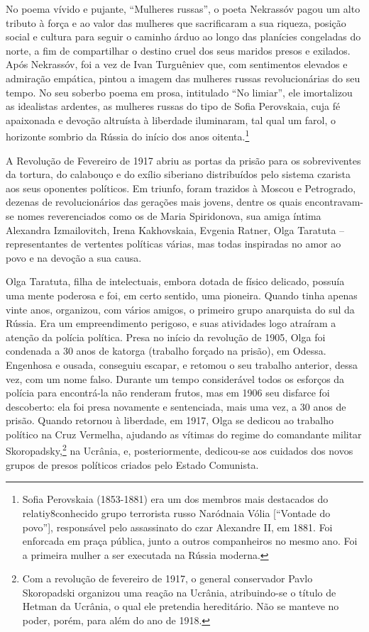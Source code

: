 No poema vívido e pujante, ``Mulheres russas'', o poeta Nekrassóv pagou
um alto tributo à força e ao valor das mulheres que sacrificaram a sua
riqueza, posição social e cultura para seguir o caminho árduo ao longo
das planícies congeladas do norte, a fim de compartilhar o destino cruel
dos seus maridos presos e exilados. Após Nekrassóv, foi a vez de Ivan
Turguêniev que, com sentimentos elevados e admiração empática, pintou a
imagem das mulheres russas revolucionárias do seu tempo. No seu soberbo
poema em prosa, intitulado ``No limiar'', ele imortalizou as idealistas
ardentes, as mulheres russas do tipo de Sofia Perovskaia, cuja fé
apaixonada e devoção altruísta à liberdade iluminaram, tal qual um
farol, o horizonte sombrio da Rússia do início dos anos
oitenta.\footnote{Sofia Perovskaia (1853-1881) era um dos membros mais
  destacados do relatiy8conhecido grupo terrorista russo Naródnaia Vólia
  {[}``Vontade do povo''{]}, responsável pelo assassinato do czar
  Alexandre II, em 1881. Foi enforcada em praça pública, junto a outros
  companheiros no mesmo ano. Foi a primeira mulher a ser executada na
  Rússia moderna.}

A Revolução de Fevereiro de 1917 abriu as portas da prisão para os
sobreviventes da tortura, do calabouço e do exílio siberiano
distribuídos pelo sistema czarista aos seus oponentes políticos. Em
triunfo, foram trazidos à Moscou e Petrogrado, dezenas de
revolucionários das gerações mais jovens, dentre os quais encontravam-se
nomes reverenciados como os de Maria Spiridonova, sua amiga íntima
Alexandra Izmailovitch, Irena Kakhovskaia, Evgenia Ratner, Olga Taratuta
-- representantes de vertentes políticas várias, mas todas inspiradas no
amor ao povo e na devoção a sua causa.

Olga Taratuta, filha de intelectuais, embora dotada de físico delicado,
possuía uma mente poderosa e foi, em certo sentido, uma pioneira. Quando
tinha apenas vinte anos, organizou, com vários amigos, o primeiro grupo
anarquista do sul da Rússia. Era um empreendimento perigoso, e suas
atividades logo atraíram a atenção da polícia política. Presa no início
da revolução de 1905, Olga foi condenada a 30 anos de katorga (trabalho
forçado na prisão), em Odessa. Engenhosa e ousada, conseguiu escapar, e
retomou o seu trabalho anterior, dessa vez, com um nome falso. Durante
um tempo considerável todos os esforços da polícia para encontrá-la não
renderam frutos, mas em 1906 seu disfarce foi descoberto: ela foi presa
novamente e sentenciada, mais uma vez, a 30 anos de prisão. Quando
retornou à liberdade, em 1917, Olga se dedicou ao trabalho político na
Cruz Vermelha, ajudando as vítimas do regime do comandante militar
Skoropadsky,\footnote{Com a revolução de fevereiro de 1917, o general
  conservador Pavlo Skoropadski organizou uma reação na Ucrânia,
  atribuindo-se o título de Hetman da Ucrânia, o qual ele pretendia
  hereditário. Não se manteve no poder, porém, para além do ano de 1918.}
na Ucrânia, e, posteriormente, dedicou-se aos cuidados dos novos grupos
de presos políticos criados pelo Estado Comunista.

